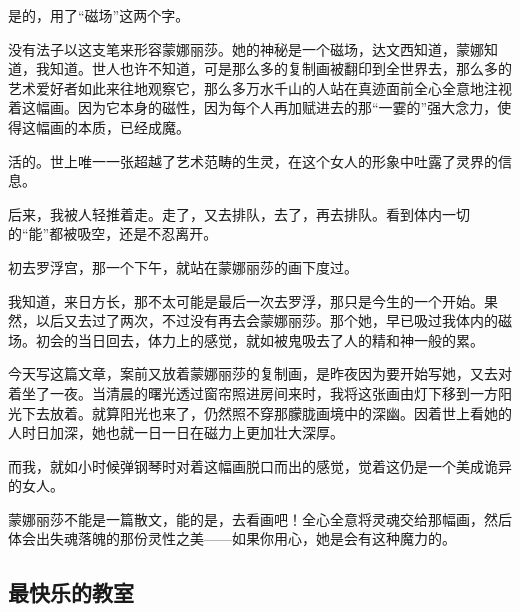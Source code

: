 \par 是的，用了“磁场”这两个字。
\par 没有法子以这支笔来形容蒙娜丽莎。她的神秘是一个磁场，达文西知道，蒙娜知道，我知道。世人也许不知道，可是那么多的复制画被翻印到全世界去，那么多的艺术爱好者如此来往地观察它，那么多万水千山的人站在真迹面前全心全意地注视着这幅画。因为它本身的磁性，因为每个人再加赋进去的那“一霎的”强大念力，使得这幅画的本质，已经成魔。
\par 活的。世上唯一一张超越了艺术范畴的生灵，在这个女人的形象中吐露了灵界的信息。
\par 后来，我被人轻推着走。走了，又去排队，去了，再去排队。看到体内一切的“能”都被吸空，还是不忍离开。
\par 初去罗浮宫，那一个下午，就站在蒙娜丽莎的画下度过。
\par 我知道，来日方长，那不太可能是最后一次去罗浮，那只是今生的一个开始。果然，以后又去过了两次，不过没有再去会蒙娜丽莎。那个她，早已吸过我体内的磁场。初会的当日回去，体力上的感觉，就如被鬼吸去了人的精和神一般的累。
\par 今天写这篇文章，案前又放着蒙娜丽莎的复制画，是昨夜因为要开始写她，又去对着坐了一夜。当清晨的曙光透过窗帘照进房间来时，我将这张画由灯下移到一方阳光下去放着。就算阳光也来了，仍然照不穿那朦胧画境中的深幽。因着世上看她的人时日加深，她也就一日一日在磁力上更加壮大深厚。
\par 而我，就如小时候弹钢琴时对着这幅画脱口而出的感觉，觉着这仍是一个美成诡异的女人。
\par 蒙娜丽莎不能是一篇散文，能的是，去看画吧！全心全意将灵魂交给那幅画，然后体会出失魂落魄的那份灵性之美——如果你用心，她是会有这种魔力的。




\subsection{最快乐的教室}



